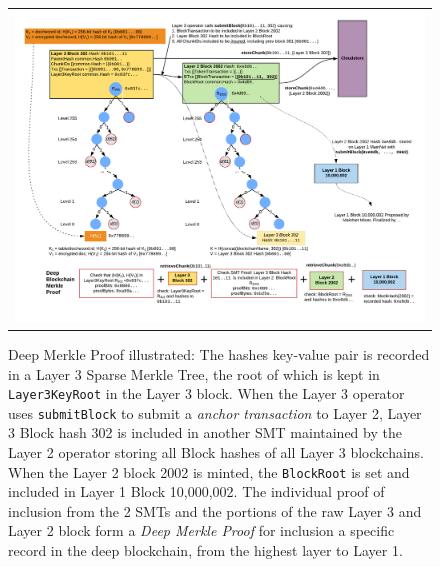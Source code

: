 \documentclass{article}
\begin{document}
\begin{figure}[t]
\begin{tabular}{c}
\includegraphics[width=17cm]{DeepMerkleProof.png} \\
\end{tabular}
\caption{\small Deep Merkle Proof illustrated: The hashes key-value pair is recorded in a Layer 3 Sparse Merkle Tree, the root of which is kept in \texttt{Layer3KeyRoot} in the Layer 3 block.  When the Layer 3 operator uses \texttt{submitBlock} to submit a {\em anchor transaction} to Layer 2,  Layer 3 Block hash 302 is included in another SMT maintained by the Layer 2 operator storing all Block hashes of all Layer 3 blockchains.  When the Layer 2 block 2002 is minted, the \texttt{BlockRoot} is set and included in Layer 1 Block 10,000,002.  The individual proof of inclusion from the 2 SMTs and the portions of the raw Layer 3 and Layer 2 block form a {\em Deep Merkle Proof} for inclusion a specific record in the deep blockchain, from the highest layer to Layer 1.}
\centering
\label{deepmerkleproof}
\end{figure}
\end{document}

